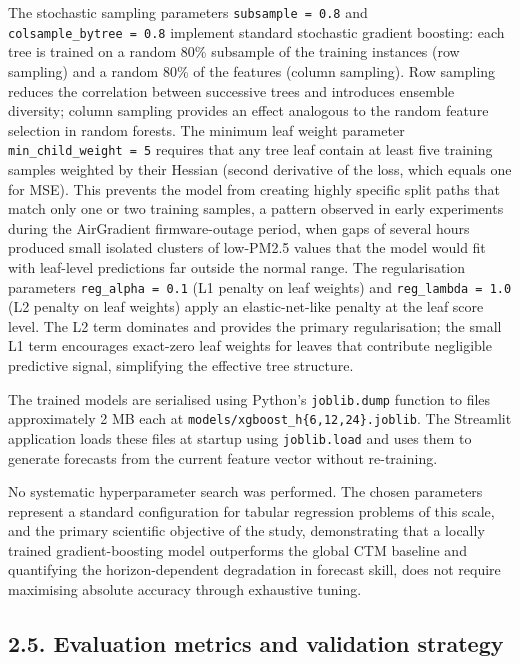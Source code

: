 The stochastic sampling parameters \texttt{subsample\ =\ 0.8} and \texttt{colsample\_bytree\ =\ 0.8} implement standard stochastic gradient boosting: each tree is trained on a random 80\% subsample of the training instances (row sampling) and a random 80\% of the features (column sampling). Row sampling reduces the correlation between successive trees and introduces ensemble diversity; column sampling provides an effect analogous to the random feature selection in random forests. The minimum leaf weight parameter \texttt{min\_child\_weight\ =\ 5} requires that any tree leaf contain at least five training samples weighted by their Hessian (second derivative of the loss, which equals one for MSE). This prevents the model from creating highly specific split paths that match only one or two training samples, a pattern observed in early experiments during the AirGradient firmware-outage period, when gaps of several hours produced small isolated clusters of low-PM2.5 values that the model would fit with leaf-level predictions far outside the normal range. The regularisation parameters \texttt{reg\_alpha\ =\ 0.1} (L1 penalty on leaf weights) and \texttt{reg\_lambda\ =\ 1.0} (L2 penalty on leaf weights) apply an elastic-net-like penalty at the leaf score level. The L2 term dominates and provides the primary regularisation; the small L1 term encourages exact-zero leaf weights for leaves that contribute negligible predictive signal, simplifying the effective tree structure.

The trained models are serialised using Python's \texttt{joblib.dump} function to files approximately 2 MB each at \texttt{models/xgboost\_h\{6,12,24\}.joblib}. The Streamlit application loads these files at startup using \texttt{joblib.load} and uses them to generate forecasts from the current feature vector without re-training.

No systematic hyperparameter search was performed. The chosen parameters represent a standard configuration for tabular regression problems of this scale, and the primary scientific objective of the study, demonstrating that a locally trained gradient-boosting model outperforms the global CTM baseline and quantifying the horizon-dependent degradation in forecast skill, does not require maximising absolute accuracy through exhaustive tuning.

\subsection{2.5. Evaluation metrics and validation strategy}\label{evaluation-metrics-and-validation-strategy}

